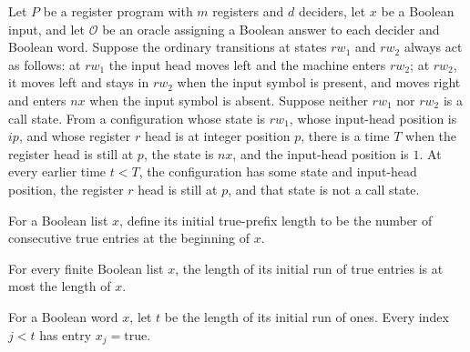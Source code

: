 \begin{lemma}
\label{Complexity.LogProg.rewind_x}
\leanok
{}
Let $P$ be a register program with $m$ registers and $d$ deciders, let $x$ be a Boolean
input, and let $\mathcal O$ be an oracle assigning a Boolean answer to each decider and
Boolean word. Suppose the ordinary transitions at states $rw_1$ and $rw_2$ always act as
follows: at $rw_1$ the input head moves left and the machine enters $rw_2$; at $rw_2$,
it moves left and stays in $rw_2$ when the input symbol is present, and moves right and
enters $nx$ when the input symbol is absent. Suppose neither $rw_1$ nor $rw_2$ is a call
state. From a configuration whose state is $rw_1$, whose input-head position is $ip$,
and whose register $r$ head is at integer position $p$, there is a time $T$ when the
register head is still at $p$, the state is $nx$, and the input-head position is $1$. At
every earlier time $t<T$, the configuration has some state and input-head position, the
register $r$ head is still at $p$, and that state is not a call state.
\end{lemma}

\begin{definition}
\label{Complexity.LogProg.tRun}
\leanok
For a Boolean list $x$, define its initial true-prefix length to be the number of
consecutive true entries at the beginning of $x$.
\end{definition}

\begin{lemma}
\label{Complexity.LogProg.tRun_le}
\leanok
{}
For every finite Boolean list $x$, the length of its initial run of true entries is at
most the length of $x$.
\end{lemma}

\begin{lemma}
\leanok
{}
For a Boolean word $x$, let $t$ be the length of its initial run of ones. Every index
$j<t$ has entry $x_j=\mathrm{true}$.
\end{lemma}


